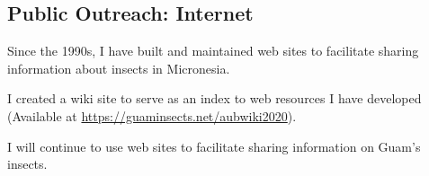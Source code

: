 \begin{comment}

\raggedright\vspace{2mm}\textbf{Activity}
\begin{itemize}
\item Presentations \cite{moore2018building2,blas2018protecting,deloso2018parasitoid,moore2018freecell,moore2018coconut,moore2018biological2,moore2018freecell2,marshall2018progress,moore2018attempted,moore2017impactof,moore2018biological,moore2018building,moore2017invasion,moore2017coconut,moore2017usingfree,moore2017accessto,moore2017biological,moore2017thecoconut,moore2017biological2,moore2017biological3}
\item Workshops \cite{berringer2018sixteenth,moore2017bringyour,moore2018cnasworkshop,quitugua20182018coconut}
\item Press \cite{moore2018special,varietyuogseeks,pacific2018scientists,2018viralcontrol,postnewtree,leonguerrero2018interview,2018g2ghuman,2017tracking}
\end{itemize}
\raggedright\vspace{2mm}\textbf{Reference(s)}

\begin{btSect}[vancouver]{zotero}
\btPrintCited
\end{btSect}
\newpage{}
\end{btUnit}

\begin{btUnit}

\end{comment}

\subsection{Public Outreach: Internet}

Since the 1990s, I have built and maintained web sites to facilitate sharing information about insects in Micronesia.

\activities

I created a wiki site to serve as an index to web resources I have developed (Available at  \url{https://guaminsects.net/aubwiki2020}).

\plans

I will continue to use web sites to facilitate sharing information on Guam's insects.

